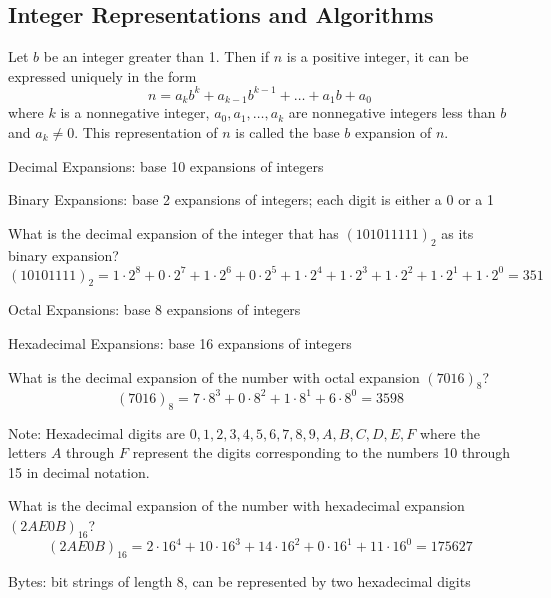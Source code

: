 \documentclass[12pt]{article}
\begin{document}
\subsection{Integer Representations and Algorithms} 
\begin{theorem} Let $b$ be an integer greater than 1. Then if $n$ is a positive integer, it can be expressed uniquely in the form $$n = a_kb^k + a_{k - 1}b^{k - 1} + \dots + a_1b + a_0$$ where $k$ is a nonnegative integer, $a_0, a_1, \dots, a_k$ are nonnegative integers less than $b$ and $a_k \neq 0$. This representation of $n$ is called the base $b$ expansion of $n$. \end{theorem} 
\begin{definition} Decimal Expansions: base 10 expansions of integers \end{definition} 
\begin{definition} Binary Expansions: base 2 expansions of integers; each digit is either a 0 or a 1 \end{definition} 
\begin{example} What is the decimal expansion of the integer that has $(101011111)_2$ as its binary expansion? $$(10101111)_2 = 1 \cdot 2^8 + 0 \cdot 2^7 + 1 \cdot 2^6 + 0 \cdot 2^5 + 1 \cdot 2^4 + 1 \cdot 2^3 + 1 \cdot 2^2 + 1 \cdot 2^1 + 1 \cdot 2^0 = 351$$ \end{example} 
\begin{definition} Octal Expansions: base 8 expansions of integers \end{definition} 
\begin{definition} Hexadecimal Expansions: base 16 expansions of integers \end{definition} 
\begin{example} What is the decimal expansion of the number with octal expansion $(7016)_8$? $$(7016)_8 = 7 \cdot 8^3 + 0 \cdot 8^2 + 1 \cdot 8^1 + 6 \cdot 8^0 = 3598$$ \end{example}
Note: Hexadecimal digits are $0, 1, 2, 3, 4, 5, 6, 7, 8, 9, A, B, C, D, E, F$ where the letters $A$ through $F$ represent the digits corresponding to the numbers 10 through 15 in decimal notation. 
\begin{example} What is the decimal expansion of the number with hexadecimal expansion $(2AE0B)_{16}$? $$ (2AE0B)_{16} = 2 \cdot 16^4 + 10 \cdot 16^3 + 14 \cdot 16^2 + 0 \cdot 16^1 + 11 \cdot 16^0 = 175627$$ \end{example} 
\begin{definition} Bytes: bit strings of length 8, can be represented by two hexadecimal digits \end{definition} 
\end{document}
